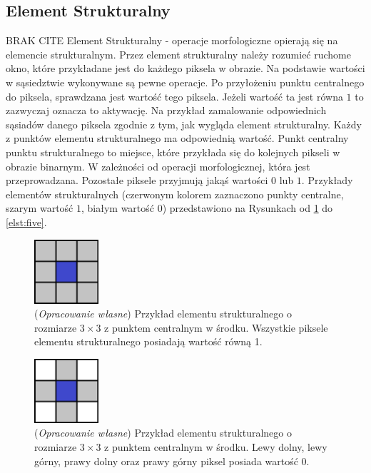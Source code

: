 \documentclass{article}
\begin{document}
        \subsection{Element Strukturalny}
        {
            BRAK CITE
            \label{sec:element-strukturalny}
            \Large
            \justifying
            \quad
            Element Strukturalny - operacje morfologiczne opierają się na elemencie strukturalnym.
            Przez element strukturalny należy rozumieć ruchome okno, które przykładane jest do każdego piksela w obrazie.
            Na podstawie wartości w sąsiedztwie wykonywane są pewne operacje.
            Po przyłożeniu punktu centralnego do piksela, sprawdzana jest wartość tego piksela.
            Jeżeli wartość ta jest równa \(1\) to zazwyczaj oznacza to aktywację.
            Na przykład zamalowanie odpowiednich sąsiadów danego piksela zgodnie z tym, jak wygląda element strukturalny.
            Każdy z punktów elementu strukturalnego ma odpowiednią wartość.
            Punkt centralny punktu strukturalnego to miejsce, które przykłada się do kolejnych pikseli w obrazie binarnym.
            W zależności od operacji morfologicznej, która jest przeprowadzana.
            Pozostałe piksele przyjmują jakąś wartości \(0\) lub \(1\).
            Przykłady elementów strukturalnych (czerwonym kolorem zaznaczono punkty centralne, szarym wartość \(1\), białym wartość \(0\)) przedstawiono na Rysunkach od \ref{elst:one} do \ref{elst:five}.
        }
        \begin{figure}[H]
            \captionsetup{margin=1.5cm}
            \centering
            \includegraphics[width=90px]{element_strukturalny_1.png}
            \caption
            {
                (\textit{Opracowanie własne}) Przykład elementu strukturalnego o rozmiarze \(3 \times 3\) z punktem centralnym w środku.
                Wszystkie piksele elementu strukturalnego posiadają wartość równą 1.
            }
            \label{elst:one}
        \end{figure}

        \begin{figure}[H]
            \captionsetup{margin=1.5cm}
            \centering
            \includegraphics[width=90px]{element_strukturalny_2.png}
            \caption
            {
                (\textit{Opracowanie własne}) Przykład elementu strukturalnego o rozmiarze \(3 \times 3\) z punktem centralnym w środku.
                Lewy dolny, lewy górny, prawy dolny oraz prawy górny piksel posiada wartość 0.
            }
            \label{elst:two}
        \end{figure}
\end{document}
